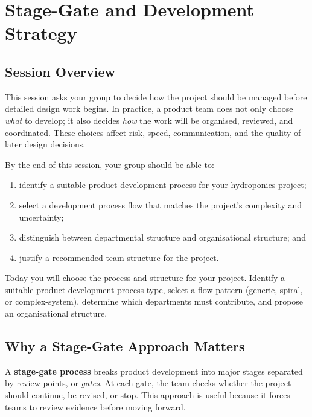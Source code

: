 \chapter{Stage-Gate and Development Strategy}

\section{Session Overview}

This session asks your group to decide how the project should be managed before detailed design work begins. In practice, a product team does not only choose \emph{what} to develop; it also decides \emph{how} the work will be organised, reviewed, and coordinated. These choices affect risk, speed, communication, and the quality of later design decisions.

By the end of this session, your group should be able to:
\begin{enumerate}
    \item identify a suitable product development process for your hydroponics project;
    \item select a development process flow that matches the project's complexity and uncertainty;
    \item distinguish between departmental structure and organisational structure; and
    \item justify a recommended team structure for the project.
\end{enumerate}

\begin{tcolorbox}[title=Goal]
Today you will choose the process and structure for your project. Identify a suitable product-development process type, select a flow pattern (generic, spiral, or complex-system), determine which departments must contribute, and propose an organisational structure.
\end{tcolorbox}

\section{Why a Stage-Gate Approach Matters}

A \textbf{stage-gate process} breaks product development into major stages separated by review points, or \emph{gates}. At each gate, the team checks whether the project should continue, be revised, or stop. This approach is useful because it forces teams to review evidence before moving forward.

